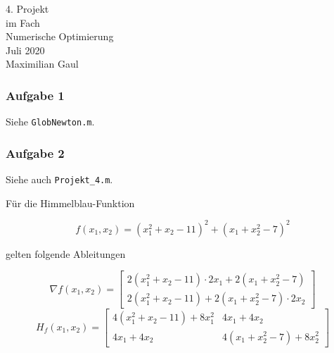 \documentclass[a4paper, 12pt]{report}
\begin{document}
\begin{center}
    \vspace*{2em}
    \normalsize 4. Projekt\\
    \vspace*{1em}
    \vspace*{4em}
    \normalsize im Fach\\
    \vspace*{1em}
    \large Numerische Optimierung\\
    \vspace*{30em}
    \normalsize Juli 2020\\
    \vspace*{1em}
    \normalsize Maximilian Gaul
\end{center}

\thispagestyle{empty}

\newpage

\subsubsection{Aufgabe 1}
Siehe \lstinline[basicstyle=\ttfamily\color{black}]|GlobNewton.m|.

\subsubsection{Aufgabe 2}
Siehe auch \lstinline[basicstyle=\ttfamily\color{black}]|Projekt_4.m|.\par

Für die Himmelblau-Funktion

$$ f(x_1, x_2) = (x_1^2 + x_2 - 11)^2 + (x_1 + x_2^2 - 7)^2 $$

gelten folgende Ableitungen

$$ \nabla f(x_1, x_2) = \begin{bmatrix}2(x_1^2 + x_2 - 11)\cdot 2x_1 + 2 (x_1 + x_2^2 - 7)\\2(x_1^2 + x_2 - 11) + 2(x_1 + x_2^2 - 7)\cdot 2x_2\end{bmatrix} $$
$$ H_f(x_1, x_2) = \begin{bmatrix}4(x_1^2 + x_2 - 11) + 8x_1^2 & 4x_1 + 4x_2\\4x_1 + 4x_2 & 4 (x_1 + x_2^2 - 7) + 8x_2^2\end{bmatrix} $$
\end{document}
